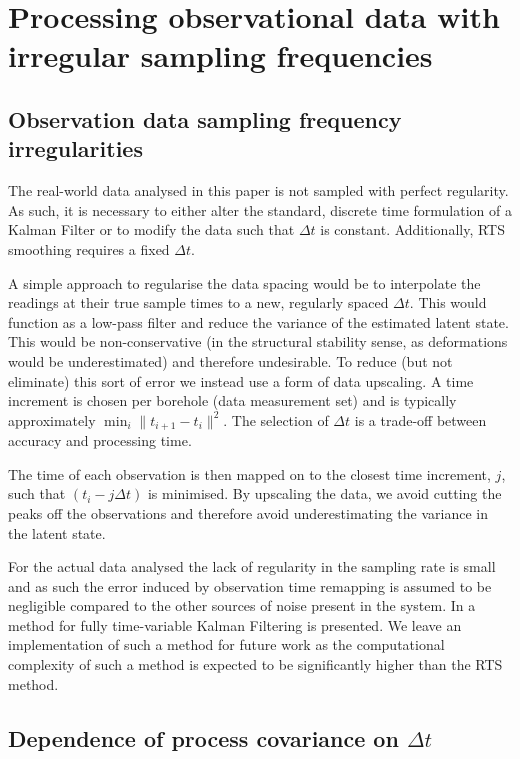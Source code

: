 \documentclass[pamm,a4paper,fleqn]{w-art}
\begin{document}
\section{Processing observational data with irregular sampling frequencies}

\subsection{Observation data sampling frequency irregularities}

The real-world data analysed in this paper is not sampled with perfect regularity. As such, it is necessary to either alter the standard, discrete time formulation of a Kalman Filter or to modify the data such that $\Delta t$ is constant. Additionally, RTS smoothing requires a fixed $\Delta t$. 

A simple approach to regularise the data spacing would be to interpolate the readings at their true sample times to a new, regularly spaced $\Delta t$. This would function as a low-pass filter and reduce the variance of the estimated latent state. This would be non-conservative (in the structural stability sense, as deformations would be underestimated) and therefore undesirable. To reduce (but not eliminate) this sort of error we instead use a form of data upscaling. A time increment is chosen per borehole (data measurement set) and is typically approximately $\min_i \| t_{i+1} - t_{i}\|^2$. The selection of $\Delta t$ is a trade-off between accuracy and processing time. 

The time of each observation is then mapped on to the closest time increment, $j$, such that $(t_i - j\Delta t)$ is minimised. By upscaling the data, we avoid cutting the peaks off the observations and therefore avoid underestimating the variance in the latent state.

For the actual data analysed the lack of regularity in the sampling rate is small and as such the error induced by observation time remapping is assumed to be negligible compared to the other sources of noise present in the system. In \cite{chen2021time} a method for fully time-variable Kalman Filtering is presented. We leave an implementation of such a method for future work as the computational complexity of such a method is expected to be significantly higher than the RTS method.


\subsection{Dependence of process covariance on $\Delta t$}
\label{ssec:processcovardt}
\end{document}
